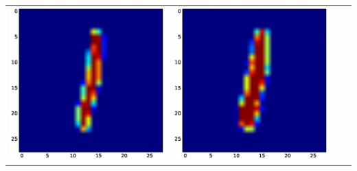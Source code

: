 \documentclass{article}
\begin{document}
\begin{tabular}{cccc}
\includegraphics[scale=.1]{fig/MNIST_207_2_2_510_1.eps}&
\includegraphics[scale=.1]{fig/MNIST_207_2_3_514_1.eps} 
 



\end{tabular}
\end{document}
